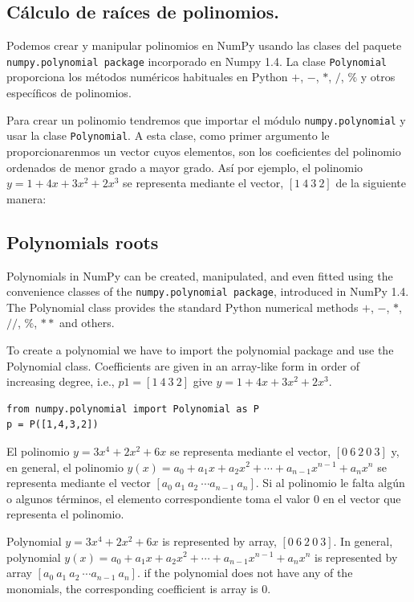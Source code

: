 \begin{paracol}{2}
\subsection{Cálculo de raíces de polinomios.} 

Podemos crear y manipular polinomios en NumPy usando las clases del paquete\\ \texttt{numpy.polynomial package} incorporado en Numpy 1.4. La clase \texttt{Polynomial} proporciona los métodos numéricos habituales en Python $+$, $-$, $*$, $/$, $\%$ y otros específicos de polinomios.

Para crear un polinomio tendremos que importar el módulo \texttt{numpy.polynomial} y usar la clase \texttt{Polynomial}. A esta clase, como primer argumento le proporcionarenmos un vector cuyos elementos, son los coeficientes del polinomio ordenados de  menor grado a mayor grado. Así por ejemplo, el polinomio $y=1 + 4x + 3x^2+2x^3$ se representa mediante el vector, $[1\ 4\ 3\ 2]$ de la siguiente manera:

\switchcolumn

\subsection{Polynomials roots}
Polynomials in NumPy can be created, manipulated, and even fitted using the convenience classes of the \texttt{numpy.polynomial package}, introduced in NumPy 1.4. The Polynomial class provides the standard Python numerical methods $+$, $-$, $*$, $//$, $\%$, $**$ and others. 

To create a polynomial we have to import the polynomial package and use the Polynomial class. Coefficients are given in an array-like form in order of increasing degree, i.e., $p1=[1\ 4\ 3\ 2]$  give $y=1 + 4x + 3x^2+2x^3$.
\end{paracol}

\begin{verbatim}
from numpy.polynomial import Polynomial as P
p = P([1,4,3,2])
\end{verbatim}

\begin{paracol}{2}
El polinomio $y=3x^4+2x^2+6x$ se representa mediante el vector,  $[0\ 6\ 2\ 0\ 3]$ y, en general, el polinomio $y(x)=a_0+a_1x+a_2x^2+\cdots+a_{n-1}x^{n-1}+ a_nx^n$  se representa mediante el vector $[a_0\ a_1\ a_2\  \cdots  a_{n-1}\ a_n]$. Si al polinomio le falta algún o algunos términos, el elemento correspondiente toma el valor $0$ en el vector que representa el polinomio.    

\switchcolumn

Polynomial $y=3x^4+2x^2+6x$ is represented by array,  $[0\ 6\ 2\ 0\ 3]$. In general, polynomial $y(x)=a_0+a_1x+a_2x^2+\cdots+a_{n-1}x^{n-1}+ a_nx^n$  is represented by array $[a_0\ a_1\ a_2\  \cdots  a_{n-1}\ a_n]$. if the polynomial does not have any of the monomials, the corresponding coefficient is array  is $0$.    

\end{paracol}


